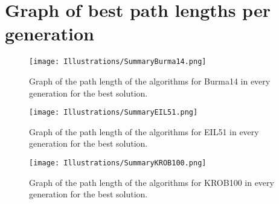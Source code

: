 \chapter{Graph of best path lengths per generation}
\label{chap:appendix3}


\begin{figure}[H]
	\caption{Graph of the path length of the algorithms for Burma14 in every generation for the best solution.}
	\texttt{[image: Illustrations/SummaryBurma14.png]}
	\centering
	\label{fig:Burma14Best}
\end{figure}

\begin{figure}[H]
	\caption{Graph of the path length of the algorithms for EIL51 in every generation for the best solution.}
	\texttt{[image: Illustrations/SummaryEIL51.png]}
	\centering
	\label{fig:EIL51Best}
\end{figure}

\begin{figure}[H]
	\caption{Graph of the path length of the algorithms for KROB100 in every generation for the best solution.}
	\texttt{[image: Illustrations/SummaryKROB100.png]}
	\centering
	\label{fig:KROB100Best}
\end{figure}
